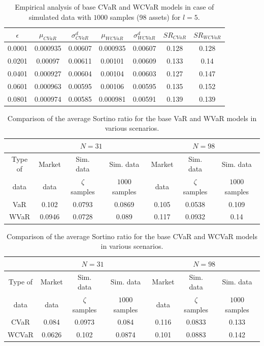 \documentclass[12pt]{article}
\numberwithin{equation}{section}
\begin{document}
\begin{table}[!h]
\centering
\captionsetup{justification=centering}
\begin{tabular}{||c|c|c|c|c|c|c||}
\hline
$\epsilon$ & $\mu_{CVaR}$ & $\sigma_{CVaR}^{d}$ & $\mu_{WCVaR}$ & $\sigma_{WCVaR}^{d}$ & $SR_{CVaR}$ & $SR_{WCVaR}$\\
\hline
0.0001 & 0.000935 & 0.00607 & 0.000935 & 0.00607 & 0.128 & 0.128 \\
0.0201 & 0.00097 & 0.00611 & 0.00101 & 0.00609 & 0.133 & 0.14 \\
0.0401 & 0.000927 & 0.00604 & 0.00104 & 0.00603 & 0.127 & 0.147 \\
0.0601 & 0.000963 & 0.00595 & 0.00106 & 0.00595 & 0.135 & 0.152 \\
0.0801 & 0.000974 & 0.00585 & 0.000981 & 0.00591 & 0.139 & 0.139 \\
\hline
\end{tabular}
\caption{Empirical analysis of base CVaR and WCVaR models in case of simulated data with $1000$ samples (98 assets) for $l=5$.}
\label{tab:6.6}
\end{table}

\begin{table}[!h]
\centering
\small
\captionsetup{justification=centering}
\begin{tabular}{|c|c|c|c|c|c|c|}
\hline
\multirow{2}{*}{} $N$ &
\multicolumn{3}{c|}{$N=31$} &
\multicolumn{3}{c|}{$N=98$}  \\
\hline
Type of & Market & Sim. data & Sim. data & Market & Sim. data & Sim. data \\
data & data & $\zeta$ samples & $1000$ samples & data & $\zeta$ samples & $1000$ samples \\
\hline
VaR & 0.102 & 0.0793 & 0.0869 & 0.105 & 0.0538 & 0.109 \\
\hline
WVaR & 0.0946 & 0.0728 & 0.089 & 0.117 & 0.0932 & 0.14 \\
\hline
\end{tabular}
\caption{Comparison of the average Sortino ratio for the base VaR and WVaR models in various scenarios.}
\label{tab:var_conc}
\end{table}

\begin{table}[!h]
\centering
\small
\captionsetup{justification=centering}
\begin{tabular}{|c|c|c|c|c|c|c|}
\hline
\multirow{2}{*}{} $N$ &
\multicolumn{3}{c|}{$N=31$} &
\multicolumn{3}{c|}{$N=98$}  \\
\hline
Type of & Market & Sim. data & Sim. data & Market & Sim. data & Sim. data \\
data & data & $\zeta$ samples & $1000$ samples & data & $\zeta$ samples & $1000$ samples \\
\hline
CVaR & 0.084 & 0.0973 & 0.084 & 0.116 & 0.0833 & 0.133 \\
\hline
WCVaR & 0.0626 & 0.102 & 0.0874 & 0.101 & 0.0883 & 0.142 \\
\hline
\end{tabular}
\caption{Comparison of the average Sortino ratio for the base CVaR and WCVaR models in various scenarios.}
\label{tab:cvar_conc}
\end{table}
\end{document}
